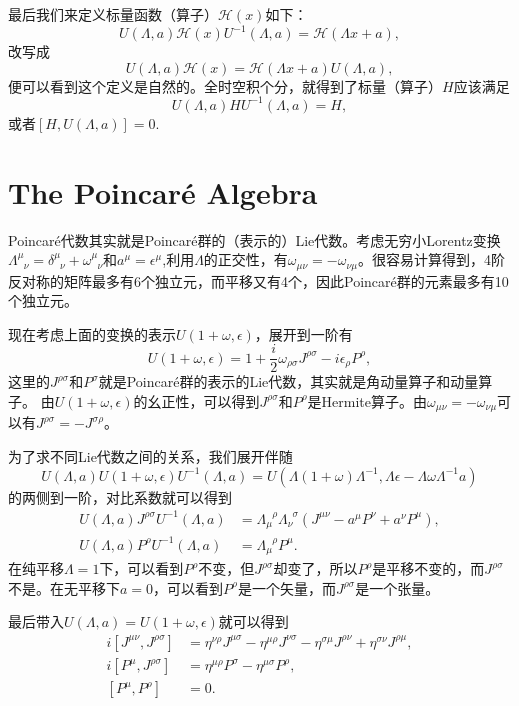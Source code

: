 \documentclass[9pt]{extbook}
\begin{document}
最后我们来定义标量函数（算子）$\mathscr{H}(x)$如下：
\[
	U(\Lambda,a)\mathscr{H}(x) U^{-1}(\Lambda,a)=\mathscr{H}(\Lambda x+a),
\]
改写成
\[
	U(\Lambda,a)\mathscr{H}(x) =\mathscr{H}(\Lambda x+a)U(\Lambda,a),
\]
便可以看到这个定义是自然的。全时空积个分，就得到了标量（算子）$H$应该满足
\[
	U(\Lambda,a)H U^{-1}(\Lambda,a)=H,
\]
或者$[H,U(\Lambda,a)]=0$.

\section{The Poincar\'{e} Algebra}
Poincar\'{e}代数其实就是Poincar\'{e}群的（表示的）Lie代数。考虑无穷小Lorentz变换$\Lambda^\mu_{\phantom{\mu}\nu}=\delta^\mu_{\phantom{\mu}\nu}+\omega^{\mu}_{\phantom{\mu}\nu}$和$a^{\mu}=\epsilon^\mu$,利用$\Lambda$的正交性，有$\omega_{\mu\nu}=-\omega_{\nu\mu}$。很容易计算得到，4阶反对称的矩阵最多有6个独立元，而平移又有4个，因此Poincar\'{e}群的元素最多有10个独立元。

现在考虑上面的变换的表示$U(1+\omega,\epsilon)$，展开到一阶有
\[
U(1+\omega,\epsilon)=1+\frac{i}{2}\omega_{\rho\sigma}J^{\rho\sigma}-i\epsilon_\rho P^\rho,
\]
这里的$J^{\rho\sigma}$和$P^\sigma$就是Poincar\'{e}群的表示的Lie代数，其实就是角动量算子和动量算子。
由$U(1+\omega,\epsilon)$的幺正性，可以得到$J^{\rho\sigma}$和$P^\rho$是Hermite算子。由$\omega_{\mu\nu}=-\omega_{\nu\mu}$可以有$J^{\rho\sigma}=-J^{\sigma\rho}$。

为了求不同Lie代数之间的关系，我们展开伴随
\[
U(\Lambda,a)U(1+\omega,\epsilon)U^{-1}(\Lambda,a)=U(\Lambda(1+\omega)\Lambda^{-1},\Lambda\epsilon-\Lambda\omega\Lambda^{-1}a)
\]
的两侧到一阶，对比系数就可以得到
\[
\begin{split}
U(\Lambda,a)J^{\rho\sigma}U^{-1}(\Lambda,a)&=\Lambda_{\mu}^{\phantom{\mu}\rho}\Lambda_{\nu}^{\phantom{\nu}\sigma}
(J^{\mu\nu}-a^\mu P^\nu+a^\nu P^\mu),\\
U(\Lambda,a)P^{\rho}U^{-1}(\Lambda,a)&=\Lambda_{\mu}^{\phantom{\mu}\rho}P^\mu.
\end{split}
\]
在纯平移$\Lambda=1$下，可以看到$P^{\rho}$不变，但$J^{\rho\sigma}$却变了，所以$P^{\rho}$是平移不变的，而$J^{\rho\sigma}$不是。在无平移下$a=0$，可以看到$P^{\rho}$是一个矢量，而$J^{\rho\sigma}$是一个张量。

最后带入$U(\Lambda,a)=U(1+\omega,\epsilon)$就可以得到
\[
\begin{split}
	i\left[J^{\mu\nu},J^{\rho \sigma}\right]&=
	\eta^{\nu\rho}J^{\mu \sigma}-
	\eta^{\mu \rho}J^{\nu \sigma}-
	\eta^{\sigma\mu}J^{\rho \nu}+
	\eta^{\sigma\nu}J^{\rho \mu},\\
	i[P^\mu,J^{\rho\sigma}]&=\eta^{\mu \rho}P^\sigma-\eta^{\mu\sigma}P^{\rho},\\
	[P^\mu,P^\rho]&=0.
\end{split}
\]
\end{document}
